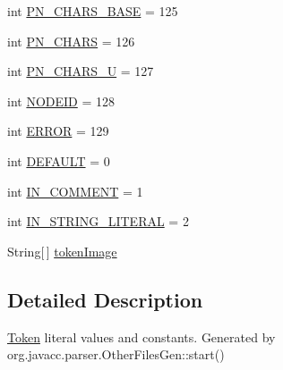 \begin{DoxyCompactItemize}
\item 
int \hyperlink{interfaceorg_1_1coode_1_1owlapi_1_1functionalparser_1_1_o_w_l_functional_syntax_parser_constants_a508ca5fe442caee875eebd6b9e1ab308}{P\-N\-\_\-\-C\-H\-A\-R\-S\-\_\-\-B\-A\-S\-E} = 125
\item 
int \hyperlink{interfaceorg_1_1coode_1_1owlapi_1_1functionalparser_1_1_o_w_l_functional_syntax_parser_constants_a6835ba2549501ecb48345674e9e10879}{P\-N\-\_\-\-C\-H\-A\-R\-S} = 126
\item 
int \hyperlink{interfaceorg_1_1coode_1_1owlapi_1_1functionalparser_1_1_o_w_l_functional_syntax_parser_constants_a998c19b6ebc0bf0bc4dce9780ef15580}{P\-N\-\_\-\-C\-H\-A\-R\-S\-\_\-\-U} = 127
\item 
int \hyperlink{interfaceorg_1_1coode_1_1owlapi_1_1functionalparser_1_1_o_w_l_functional_syntax_parser_constants_a2f22fd1aed8735dc2936e61768ef4de8}{N\-O\-D\-E\-I\-D} = 128
\item 
int \hyperlink{interfaceorg_1_1coode_1_1owlapi_1_1functionalparser_1_1_o_w_l_functional_syntax_parser_constants_a9a5b3dcedb28ad782d98e76d7fa06961}{E\-R\-R\-O\-R} = 129
\item 
int \hyperlink{interfaceorg_1_1coode_1_1owlapi_1_1functionalparser_1_1_o_w_l_functional_syntax_parser_constants_aeec454c082de26d1e06f5a95fa8f4579}{D\-E\-F\-A\-U\-L\-T} = 0
\item 
int \hyperlink{interfaceorg_1_1coode_1_1owlapi_1_1functionalparser_1_1_o_w_l_functional_syntax_parser_constants_a370b149cb5ad8d20c33c7665ccd3f173}{I\-N\-\_\-\-C\-O\-M\-M\-E\-N\-T} = 1
\item 
int \hyperlink{interfaceorg_1_1coode_1_1owlapi_1_1functionalparser_1_1_o_w_l_functional_syntax_parser_constants_a46f390b40242dba117c40e54ad6ac8e6}{I\-N\-\_\-\-S\-T\-R\-I\-N\-G\-\_\-\-L\-I\-T\-E\-R\-A\-L} = 2
\item 
String\mbox{[}$\,$\mbox{]} \hyperlink{interfaceorg_1_1coode_1_1owlapi_1_1functionalparser_1_1_o_w_l_functional_syntax_parser_constants_a87b2687775b002c0a2221643071413dc}{token\-Image}
\end{DoxyCompactItemize}


\subsection{Detailed Description}
\hyperlink{classorg_1_1coode_1_1owlapi_1_1functionalparser_1_1_token}{Token} literal values and constants. Generated by org.\-javacc.\-parser.\-Other\-Files\-Gen\-::start() 

